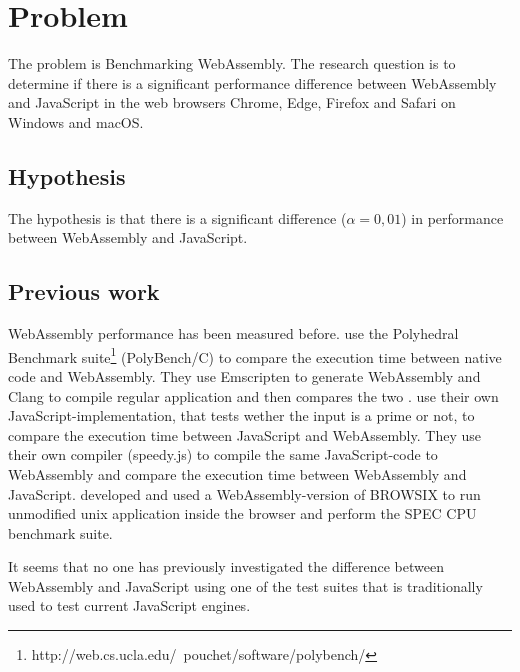 \section{Problem}
\label{problem}

The problem is Benchmarking WebAssembly. The research question is to determine if there is a significant performance difference between WebAssembly and JavaScript in the web browsers Chrome, Edge, Firefox and Safari on Windows and macOS.


\subsection{Hypothesis}

The hypothesis is that there is a significant difference ($\alpha = 0,01$) in performance between WebAssembly and JavaScript.

\subsection{Previous work}

WebAssembly performance has been measured before. \textcite{HaasRossbergSchuffTitzerHolmanGohmanWagnerZakaiBastien2017} use the Polyhedral Benchmark suite\footnote{http://web.cs.ucla.edu/~pouchet/software/polybench/} (PolyBench/C) to compare the execution time between native code and WebAssembly. They use Emscripten to generate WebAssembly and Clang \parencite{LattnerAdve2014} to compile regular application and then compares the two \parencite{HaasRossbergSchuffTitzerHolmanGohmanWagnerZakaiBastien2017}. \textcite{ReiserBlaser2017} use their own JavaScript-implementation, that tests wether the input is a prime or not, to compare the execution time between JavaScript and WebAssembly. They use their own compiler (speedy.js) to compile the same JavaScript-code to WebAssembly and compare the execution time between WebAssembly and JavaScript. \textcite{JangdaPowersGuhaBerger2019} developed and used a WebAssembly-version of BROWSIX to run unmodified unix application inside the browser and perform the SPEC CPU benchmark suite.

It seems that no one has previously investigated the difference between WebAssembly and JavaScript using one of the test suites that is traditionally used to test current JavaScript engines.

